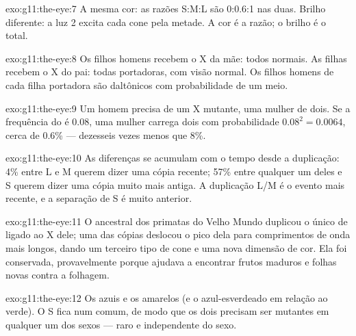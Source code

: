\begin{solution}{exo:g11:the-eye:7}
A mesma cor: as razões S:M:L são 0:0.6:1 nas duas. Brilho diferente: a
luz 2 excita cada cone pela metade. A cor é a razão; o brilho é o total.
\end{solution}

\begin{solution}{exo:g11:the-eye:8}
Os filhos homens recebem o X da mãe: todos normais. As filhas recebem o
X do pai: todas portadoras, com visão normal. Os filhos homens de cada
filha portadora são daltônicos com probabilidade de um meio.
\end{solution}

\begin{solution}{exo:g11:the-eye:9}
Um homem precisa de um X mutante, uma mulher de dois. Se a frequência
do  é 0.08, uma mulher carrega dois com probabilidade
$0.08^2 = 0.0064$, cerca de 0.6\% --- dezesseis vezes menos que 8\%.
\end{solution}

\begin{solution}{exo:g11:the-eye:10}
As diferenças se acumulam com o tempo desde a duplicação: 4\% entre L e
M querem dizer uma cópia recente; 57\% entre qualquer um deles e S
querem dizer uma cópia muito mais antiga. A duplicação L/M é o evento
mais recente, e a separação de S é muito anterior.
\end{solution}

\begin{solution}{exo:g11:the-eye:11}
O ancestral dos primatas do Velho Mundo duplicou o único  de 
ligado ao X dele; uma das cópias deslocou o pico dela para comprimentos
de onda mais longos, dando um terceiro tipo de cone e uma nova dimensão
de cor. Ela foi conservada, provavelmente porque ajudava a encontrar
frutos maduros e folhas novas contra a folhagem.
\end{solution}

\begin{solution}{exo:g11:the-eye:12}
Os azuis e os amarelos (e o azul-esverdeado em relação ao verde). O
 S fica num  comum, de modo que os dois  precisam
ser mutantes em qualquer um dos sexos --- raro e independente do sexo.
\end{solution}

